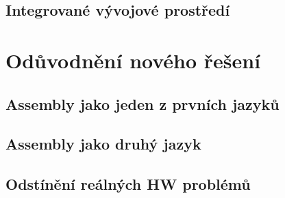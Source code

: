 \blind[2]

\subsection{Integrované vývojové prostředí}

\blind[1]

\section{Odůvodnění nového řešení}

\blind[1]

\subsection{Assembly jako jeden z prvních jazyků}

\blind[1]

\subsection{Assembly jako druhý jazyk}

\blind[2]

\subsection{Odstínění reálných HW problémů}

\blind[1]